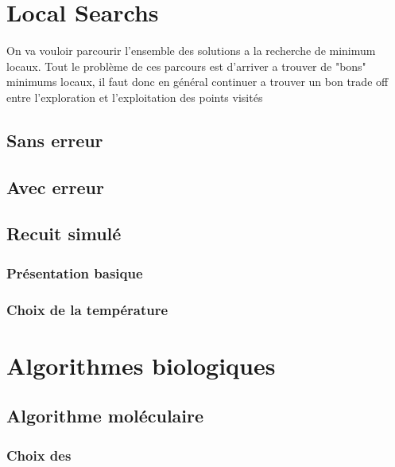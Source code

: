 \documentclass[10pt,a4paper]{article}
\begin{document}
\section{Local Searchs}

On va vouloir parcourir l'ensemble des solutions a la recherche de minimum locaux. Tout le problème de ces parcours est d'arriver a trouver de "bons" minimums locaux, il faut donc en général continuer a trouver un bon trade off entre l'exploration et l'exploitation des points visités 

\subsection{Sans erreur}

\subsection{Avec erreur}

\subsection{Recuit simulé}

\subsubsection{Présentation basique}

\subsubsection{Choix de la température}

\section{Algorithmes biologiques}

\subsection{Algorithme moléculaire}

\subsubsection{Choix des }
\end{document}
